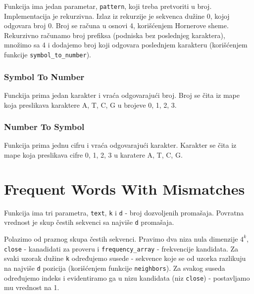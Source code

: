 Funkcija ima jedan parametar, \texttt{pattern}, koji treba pretvoriti u broj. Implementacija je rekurzivna. Izlaz iz rekurzije je sekvenca dužine 0, kojoj odgovara broj 0. Broj se računa u osnovi 4, korišćenjem Hornerove sheme. Rekurzivno računamo broj prefiksa (podniska bez poslednjeg karaktera), množimo sa 4 i dodajemo broj koji odgovara poslednjem karakteru (korišćenjem funkcije \texttt{symbol\_to\_number}).





\subsubsection{Symbol To Number}
\label{symbolToNumber}

Funckija prima jedan karakter i vraća odgovarajući broj. Broj se čita iz mape koja preslikava karaktere A, T, C, G u brojeve 0, 1, 2, 3.



\subsubsection{Number To Symbol}
\label{numberToSymbol}
Funkcija prima jednu cifru i vraća odgovarajući karakter. Karakter se čita iz mape koja preslikava cifre 0, 1, 2, 3 u karatere A, T, C, G.



\section{Frequent Words With Mismatches}

Funkcija ima tri parametra, \texttt{text}, \texttt{k} i \texttt{d} - broj dozvoljenih promašaja. Povratna vrednost je skup čestih sekvenci sa najviše \texttt{d} promašaja.

Polazimo od praznog skupa čestih sekvenci. Pravimo dva niza nula dimenzije $4^k$, \texttt{close} - kanadidati za proveru i \texttt{frequency\_array} - frekvencije kandidata. 
Za svaki uzorak dužine \texttt{k} određujemo susede - sekvence koje se od uzorka razlikuju na najviše \texttt{d} pozicija (korišćenjem funkcije \texttt{neighbors}). Za svakog suseda određujemo indeks i evidentiramo ga u nizu kandidata (niz \texttt{close}) - postavljamo mu vrednost na 1.


